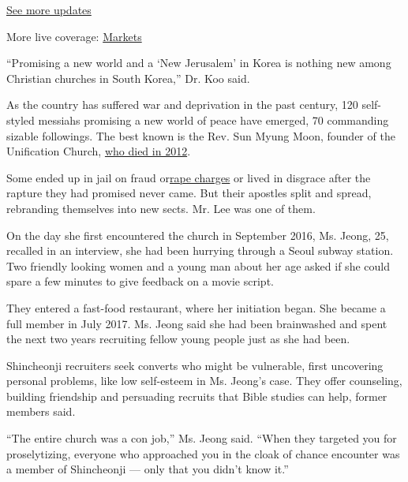 \href{https://www.nytimes3xbfgragh.onion/2020/09/11/world/covid-19-coronavirus.html?action=click\&pgtype=Article\&state=default\&region=MAIN_CONTENT_1\&context=storylines_live_updates}{See
more updates}

More live coverage:
\href{https://www.nytimes3xbfgragh.onion/live/2020/09/11/business/stock-market-today-coronavirus?action=click\&pgtype=Article\&state=default\&region=MAIN_CONTENT_1\&context=storylines_live_updates}{Markets}

``Promising a new world and a `New Jerusalem' in Korea is nothing new
among Christian churches in South Korea,'' Dr. Koo said.

As the country has suffered war and deprivation in the past century, 120
self-styled messiahs promising a new world of peace have emerged, 70
commanding sizable followings. The best known is the Rev. Sun Myung
Moon, founder of the Unification Church,
\href{https://www.nytimes3xbfgragh.onion/2012/09/03/world/asia/rev-sun-myung-moon-founder-of-unification-church-dies-at-92.html}{who
died in 2012}.

Some ended up in jail on fraud
or\href{https://www.nytimes3xbfgragh.onion/2018/11/22/world/asia/south-korea-pastor-rape.html}{rape
charges} or lived in disgrace after the rapture they had promised never
came. But their apostles split and spread, rebranding themselves into
new sects. Mr. Lee was one of them.

On the day she first encountered the church in September 2016, Ms.
Jeong, 25, recalled in an interview, she had been hurrying through a
Seoul subway station. Two friendly looking women and a young man about
her age asked if she could spare a few minutes to give feedback on a
movie script.

They entered a fast-food restaurant, where her initiation began. She
became a full member in July 2017. Ms. Jeong said she had been
brainwashed and spent the next two years recruiting fellow young people
just as she had been.

Shincheonji recruiters seek converts who might be vulnerable, first
uncovering personal problems, like low self-esteem in Ms. Jeong's case.
They offer counseling, building friendship and persuading recruits that
Bible studies can help, former members said.

``The entire church was a con job,'' Ms. Jeong said. ``When they
targeted you for proselytizing, everyone who approached you in the cloak
of chance encounter was a member of Shincheonji --- only that you didn't
know it.''

